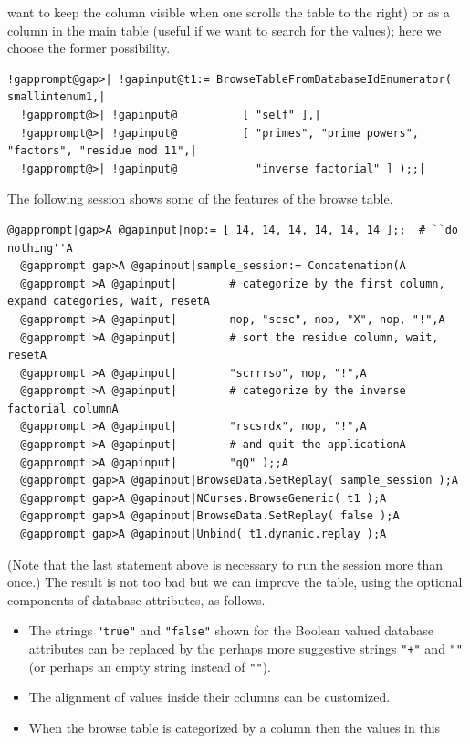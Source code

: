 \documentclass[a4paper,11pt]{report}
\begin{document}
{{want to keep the column visible when one scrolls the table to the right) or as
a column in the main table (useful if we want to search for the values); here
we choose the former possibility. 
\begin{Verbatim}[commandchars=!@|,fontsize=\small,frame=single,label=Example]
  !gapprompt@gap>| !gapinput@t1:= BrowseTableFromDatabaseIdEnumerator( smallintenum1,|
  !gapprompt@>| !gapinput@          [ "self" ],|
  !gapprompt@>| !gapinput@          [ "primes", "prime powers", "factors", "residue mod 11",|
  !gapprompt@>| !gapinput@            "inverse factorial" ] );;|
\end{Verbatim}
 The following session shows some of the features of the browse table. 
\begin{Verbatim}[commandchars=@|A,fontsize=\small,frame=single,label=Example]
  @gapprompt|gap>A @gapinput|nop:= [ 14, 14, 14, 14, 14, 14 ];;  # ``do nothing''A
  @gapprompt|gap>A @gapinput|sample_session:= Concatenation(A
  @gapprompt|>A @gapinput|        # categorize by the first column, expand categories, wait, resetA
  @gapprompt|>A @gapinput|        nop, "scsc", nop, "X", nop, "!",A
  @gapprompt|>A @gapinput|        # sort the residue column, wait, resetA
  @gapprompt|>A @gapinput|        "scrrrso", nop, "!",A
  @gapprompt|>A @gapinput|        # categorize by the inverse factorial columnA
  @gapprompt|>A @gapinput|        "rscsrdx", nop, "!",A
  @gapprompt|>A @gapinput|        # and quit the applicationA
  @gapprompt|>A @gapinput|        "qQ" );;A
  @gapprompt|gap>A @gapinput|BrowseData.SetReplay( sample_session );A
  @gapprompt|gap>A @gapinput|NCurses.BrowseGeneric( t1 );A
  @gapprompt|gap>A @gapinput|BrowseData.SetReplay( false );A
  @gapprompt|gap>A @gapinput|Unbind( t1.dynamic.replay );A
\end{Verbatim}
 (Note that the last statement above is necessary to run the session more than
once.) The result is not too bad but we can improve the table, using the
optional components of database attributes, as follows. 
\begin{itemize}
\item  The strings \texttt{"true"} and \texttt{"false"} shown for the Boolean valued database attributes can be replaced by the
perhaps more suggestive strings \texttt{"+"} and \texttt{"\texttt{}"} (or perhaps an empty string instead of \texttt{"\texttt{}"}). 
\item  The alignment of values inside their columns can be customized. 
\item  When the browse table is categorized by a column then the values in this

\end{itemize}}}
\end{document}
